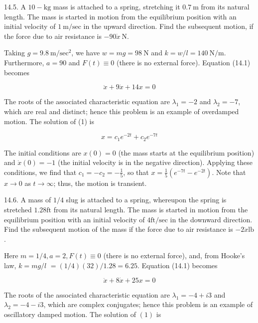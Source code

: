 \documentclass[10pt]{article}
\begin{document}
14.5. A $10-\mathrm{kg}$ mass is attached to a spring, stretching it $0.7 \mathrm{~m}$ from its natural length. The mass is started in motion from the equilibrium position with an initial velocity of $1 \mathrm{~m} / \mathrm{sec}$ in the upward direction. Find the subsequent motion, if the force due to air resistance is $-90 \dot{x} \mathrm{~N}$.

Taking $g=9.8 \mathrm{~m} / \mathrm{sec}^{2}$, we have $w=m g=98 \mathrm{~N}$ and $k=w / l=140 \mathrm{~N} / \mathrm{m}$. Furthermore, $a=90$ and $F(t) \equiv 0$ (there is no external force). Equation (14.1) becomes


\begin{equation*}
\ddot{x}+9 \dot{x}+14 x=0 \tag{1}
\end{equation*}


The roots of the associated characteristic equation are $\lambda_{1}=-2$ and $\lambda_{2}=-7$, which are real and distinct; hence this problem is an example of overdamped motion. The solution of (1) is

$$
x=c_{1} e^{-2 t}+c_{2} e^{-7 t}
$$

The initial conditions are $x(0)=0$ (the mass starts at the equilibrium position) and $\dot{x}(0)=-1$ (the initial velocity is in the negative direction). Applying these conditions, we find that $c_{1}=-c_{2}=-\frac{1}{5}$, so that $x=\frac{1}{5}\left(e^{-7 t}-e^{-2 t}\right)$. Note that $x \rightarrow 0$ as $t \rightarrow \infty$; thus, the motion is transient.

14.6. A mass of $1 / 4$ slug is attached to a spring, whereupon the spring is stretched $1.28 \mathrm{ft}$ from its natural length. The mass is started in motion from the equilibrium position with an initial velocity of $4 \mathrm{ft} / \mathrm{sec}$ in the downward direction. Find the subsequent motion of the mass if the force due to air resistance is $-2 \dot{x} \mathrm{lb}$.

Here $m=1 / 4, a=2, F(t) \equiv 0$ (there is no external force), and, from Hooke's law, $k=m g / l$ $=(1 / 4)(32) / 1.28=6.25$. Equation (14.1) becomes


\begin{equation*}
\ddot{x}+8 \dot{x}+25 x=0 \tag{1}
\end{equation*}


The roots of the associated characteristic equation are $\lambda_{1}=-4+i 3$ and $\lambda_{2}=-4-i 3$, which are complex conjugates; hence this problem is an example of oscillatory damped motion. The solution of $(1)$ is
\end{document}
